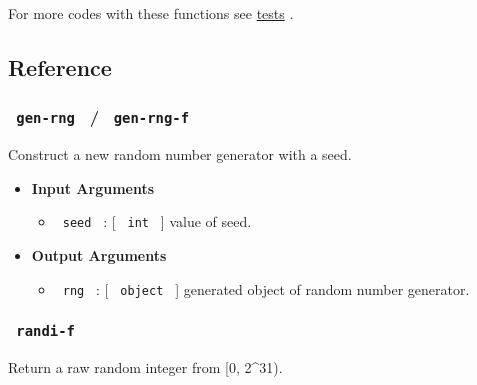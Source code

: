 
For more codes with these functions see
\href{https://github.com/typst/packages/raw/main/packages/preview/suiji/0.3.0/tests}{tests}
.

\subsection{Reference}\label{reference}

\subsubsection{\texorpdfstring{\texttt{\ gen-rng\ } /
\texttt{\ gen-rng-f\ }}{ gen-rng  /  gen-rng-f }}\label{gen-rng-gen-rng-f}

Construct a new random number generator with a seed.

\begin{Shaded}
\begin{Highlighting}[]
\end{Highlighting}
\end{Shaded}

\begin{itemize}
\item
  \textbf{Input Arguments}

  \begin{itemize}
  \tightlist
  \item
    \texttt{\ seed\ } : {[} \texttt{\ int\ } {]} value of seed.
  \end{itemize}
\item
  \textbf{Output Arguments}

  \begin{itemize}
  \tightlist
  \item
    \texttt{\ rng\ } : {[} \texttt{\ object\ } {]} generated object of
    random number generator.
  \end{itemize}
\end{itemize}

\subsubsection{\texorpdfstring{\texttt{\ randi-f\ }}{ randi-f }}\label{randi-f}

Return a raw random integer from {[}0, 2\^{}31).

